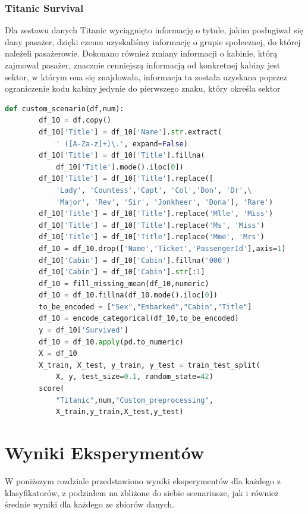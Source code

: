 \documentclass{book}
\begin{document}
\subsection{Titanic Survival}
Dla zestawu danych Titanic wyciągnięto informację o tytule, 
jakim posługiwał się dany pasażer, dzięki czemu uzyskaliśmy 
informację o grupie społecznej, do której należeli pasażerowie. 
Dokonano również zmiany informacji o kabinie, którą zajmował pasażer, 
znacznie cenniejszą informacją od konkretnej kabiny jest sektor, 
w którym ona się znajdowała, informacja ta została uzyskana poprzez 
ograniczenie kodu kabiny jedynie do pierwszego znaku, który 
określa sektor

\begin{lstlisting}[language=Python, caption={Usuwanie 
    wartości odstających}, captionpos=b]
    def custom_scenario(df,num):
        df_10 = df.copy()
        df_10['Title'] = df_10['Name'].str.extract(
            ' ([A-Za-z]+)\.', expand=False)
        df_10['Title'] = df_10['Title'].fillna(
            df_10['Title'].mode().iloc[0])
        df_10['Title'] = df_10['Title'].replace([
            'Lady', 'Countess','Capt', 'Col','Don', 'Dr',\
            'Major', 'Rev', 'Sir', 'Jonkheer', 'Dona'], 'Rare')
        df_10['Title'] = df_10['Title'].replace('Mlle', 'Miss')
        df_10['Title'] = df_10['Title'].replace('Ms', 'Miss')
        df_10['Title'] = df_10['Title'].replace('Mme', 'Mrs')
        df_10 = df_10.drop(['Name','Ticket','PassengerId'],axis=1)
        df_10['Cabin'] = df_10['Cabin'].fillna('000')
        df_10['Cabin'] = df_10['Cabin'].str[:1]
        df_10 = fill_missing_mean(df_10,numeric)
        df_10 = df_10.fillna(df_10.mode().iloc[0])
        to_be_encoded = ["Sex","Embarked","Cabin","Title"]
        df_10 = encode_categorical(df_10,to_be_encoded)
        y = df_10['Survived']
        df_10 = df_10.apply(pd.to_numeric)
        X = df_10
        X_train, X_test, y_train, y_test = train_test_split(
            X, y, test_size=0.1, random_state=42)
        score(
            "Titanic",num,"Custom_preprocessing",
            X_train,y_train,X_test,y_test)
\end{lstlisting}

\chapter{Wyniki Eksperymentów}

W poniższym rozdziale przedstawiono wyniki eksperymentów dla każdego z klasyfikatorów, 
z podziałem na zbliżone do siebie scenariusze, jak i również średnie wyniki dla każdego 
ze zbiorów danych.
\end{document}
